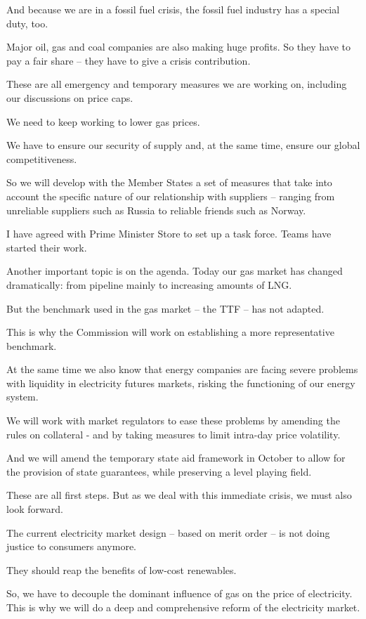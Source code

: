 \documentclass[a4paper,11pt]{article}
\begin{document}
And because we are in a fossil fuel crisis, the fossil fuel industry has a special duty, too.

Major oil, gas and coal companies are also making huge profits. So they have to pay a fair share – they have to give a crisis contribution.

These are all emergency and temporary measures we are working on, including our discussions on price caps.

We need to keep working to lower gas prices.

We have to ensure our security of supply and, at the same time, ensure our global competitiveness.

So we will develop with the Member States a set of measures that take into account the specific nature of our relationship with suppliers – ranging from unreliable suppliers such as Russia to reliable friends such as Norway.

I have agreed with Prime Minister Store to set up a task force. Teams have started their work.

Another important topic is on the agenda. Today our gas market has changed dramatically: from pipeline mainly to increasing amounts of LNG.

But the benchmark used in the gas market – the TTF – has not adapted.

This is why the Commission will work on establishing a more representative benchmark.

At the same time we also know that energy companies are facing severe problems with liquidity in electricity futures markets, risking the functioning of our energy system.

We will work with market regulators to ease these problems by amending the rules on collateral - and by taking measures to limit intra-day price volatility.

And we will amend the temporary state aid framework in October to allow for the provision of state guarantees, while preserving a level playing field.

These are all first steps. But as we deal with this immediate crisis, we must also look forward.

The current electricity market design – based on merit order – is not doing justice to consumers anymore.

They should reap the benefits of low-cost renewables.

So, we have to decouple the dominant influence of gas on the price of electricity. This is why we will do a deep and comprehensive reform of the electricity market.
\end{document}
